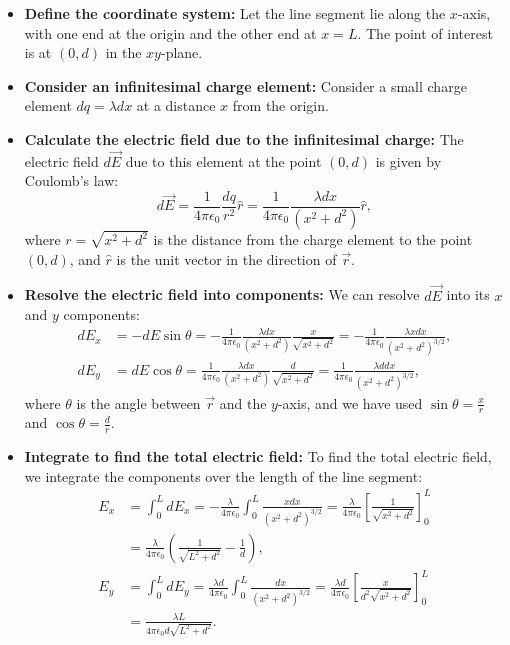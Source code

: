\documentclass{article}
\begin{document}
\begin{itemize}
\item \textbf{Define the coordinate system:}  Let the line segment lie along the \(x\)-axis, with one end at the origin and the other end at \(x = L\). The point of interest is at \((0, d)\) in the \(xy\)-plane.

\item \textbf{Consider an infinitesimal charge element:} Consider a small charge element \(dq = \lambda dx\) at a distance \(x\) from the origin.

\item \textbf{Calculate the electric field due to the infinitesimal charge:} The electric field \(d\vec{E}\) due to this element at the point \((0, d)\) is given by Coulomb's law:
    \begin{equation*}
    d\vec{E} = \frac{1}{4\pi\epsilon_0} \frac{dq}{r^2} \hat{r} = \frac{1}{4\pi\epsilon_0} \frac{\lambda dx}{(x^2 + d^2)} \hat{r},
    \end{equation*}
    where \(r = \sqrt{x^2 + d^2}\) is the distance from the charge element to the point \((0, d)\), and \(\hat{r}\) is the unit vector in the direction of \(\vec{r}\).

\item \textbf{Resolve the electric field into components:}  We can resolve \(d\vec{E}\) into its \(x\) and \(y\) components:
    \begin{align*}
    dE_x &= -dE \sin \theta = -\frac{1}{4\pi\epsilon_0} \frac{\lambda dx}{(x^2 + d^2)} \frac{x}{\sqrt{x^2 + d^2}} = -\frac{1}{4\pi\epsilon_0} \frac{\lambda x dx}{(x^2 + d^2)^{3/2}}, \\
    dE_y &= dE \cos \theta = \frac{1}{4\pi\epsilon_0} \frac{\lambda dx}{(x^2 + d^2)} \frac{d}{\sqrt{x^2 + d^2}} = \frac{1}{4\pi\epsilon_0} \frac{\lambda d dx}{(x^2 + d^2)^{3/2}},
    \end{align*}
    where \(\theta\) is the angle between \(\vec{r}\) and the \(y\)-axis, and we have used \(\sin \theta = \frac{x}{r}\) and \(\cos \theta = \frac{d}{r}\).

\item \textbf{Integrate to find the total electric field:} To find the total electric field, we integrate the components over the length of the line segment:
    \begin{align*}
    E_x &= \int_0^L dE_x = -\frac{\lambda}{4\pi\epsilon_0} \int_0^L \frac{x dx}{(x^2 + d^2)^{3/2}} = \frac{\lambda}{4\pi\epsilon_0} \left[ \frac{1}{\sqrt{x^2 + d^2}} \right]_0^L \\
    &= \frac{\lambda}{4\pi\epsilon_0} \left( \frac{1}{\sqrt{L^2 + d^2}} - \frac{1}{d} \right), \\
    E_y &= \int_0^L dE_y = \frac{\lambda d}{4\pi\epsilon_0} \int_0^L \frac{dx}{(x^2 + d^2)^{3/2}} = \frac{\lambda d}{4\pi\epsilon_0} \left[ \frac{x}{d^2 \sqrt{x^2 + d^2}} \right]_0^L \\
    &= \frac{\lambda L}{4\pi\epsilon_0 d \sqrt{L^2 + d^2}}.
    \end{align*}


\end{itemize}
\end{document}

